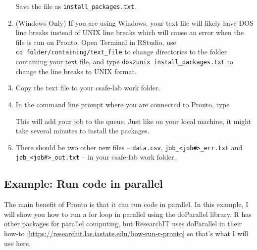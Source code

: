 \documentclass[
]{book}
\newenvironment{Shaded}{\begin{snugshade}}{\end{snugshade}}
\newcommand{\AttributeTok}[1]{\textcolor[rgb]{0.77,0.63,0.00}{#1}}
\newcommand{\BuiltInTok}[1]{#1}
\newcommand{\ExtensionTok}[1]{#1}
\newcommand{\FunctionTok}[1]{\textcolor[rgb]{0.00,0.00,0.00}{#1}}
\newcommand{\NormalTok}[1]{#1}
\newcommand{\OperatorTok}[1]{\textcolor[rgb]{0.81,0.36,0.00}{\textbf{#1}}}
\newcommand{\VariableTok}[1]{\textcolor[rgb]{0.00,0.00,0.00}{#1}}
\begin{document}
\begin{enumerate}
\begin{Shaded}
\end{Shaded}

  Save the file as \texttt{install\_packages.txt}.
\item
  (Windows Only) If you are using Windows, your text file will likely have DOS line breaks instead of UNIX line breaks which will cause an error when the file is run on Pronto. Open Terminal in RStudio, use \texttt{cd\ folder/containing/text\_file} to change directories to the folder containing your text file, and type \texttt{dos2unix\ install\_packages.txt} to change the line breaks to UNIX format.
\item
  Copy the text file to your csafe-lab work folder.
\item
  In the command line prompt where you are connected to Pronto, type

\begin{Shaded}
\end{Shaded}

  This will add your job to the queue. Just like on your local machine, it might take several minutes to install the packages.
\item
  There should be two other new files -- \texttt{data.csv}, \texttt{job\_\textless{}job\#\textgreater{}\_err.txt} and \texttt{job\_\textless{}job\#\textgreater{}\_out.txt} -- in your csafe-lab work folder.
\end{enumerate}

\hypertarget{ex-parallel}{%
\subsection{Example: Run code in parallel}\label{ex-parallel}}

The main benefit of Pronto is that it can run code in parallel. In this example, I will show you how to run a for loop in parallel using the doParallel library. R has other packages for parallel computing, but ResearchIT uses doParallel in their how-to {[}\url{https://researchit.las.iastate.edu/how-run-r-pronto}{]} so that's what I will use here.
\end{document}
